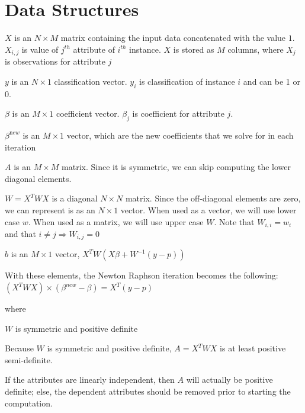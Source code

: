 \documentclass[12pt,timesnewroman,letterpaper]{article}
\begin{document}
\section{Data Structures}

\bi
\item \(X\) is an \(N \times M\) matrix containing the input data concatenated with the value $1$.
  \(X_{i, j}\) is value of \(j^{th}\) attribute of \(i^{th}\)
  instance. \(X\) is stored as \(M\) columns, where \(X_j\) is
  observations for attribute \(j\)

\item \(y\) is an \(N \times 1\) classification vector. \(y_i\) is
  classification of instance \(i\) and can be 1 or 0.
\item \(\beta\) is an \(M \times 1\) coefficient vector. \(\beta_j\)
  is coefficient for attribute \(j\). 
\item \(\beta^{\mathrm new}\) is an \(M \times 1\) vector, which are the new
  coefficients that we solve for in each iteration
\item \(A\) is an \(M \times M\) matrix. Since it is symmetric, we can skip
  computing the lower diagonal elements.
\item \(W = X^TWX\) is a diagonal \(N \times N\) matrix. Since the
  off-diagonal elements are zero, we can represent is as an \(N \times
  1\) vector.   When used as a vector, we will use lower case \(w\). When used
  as a matrix, we will use upper case \(W\). Note that \(W_{i, i} = w_i\) and
  that \( i \neq j \Rightarrow W_{i,j} = 0\)
\item \(b\) is an \(M \times 1\) vector, \(X^T W ( X \beta + W^{-1}(y - p) )\)
  \ei

With these elements, the Newton Raphson iteration becomes the following:
\\
$(X^TWX)\times (\beta^{new} - \beta) = X^T(y-p)$

where 
\be
\item \(W\) is symmetric and positive definite
\item Because \(W\) is symmetric and positive definite, \(A = 
  X^T W X\) is at least positive semi-definite.
\item If the attributes are linearly independent, then \(A\) will actually be
  positive definite; else, the dependent attributes should be removed prior to
  starting the computation.


\ee
\end{document}
